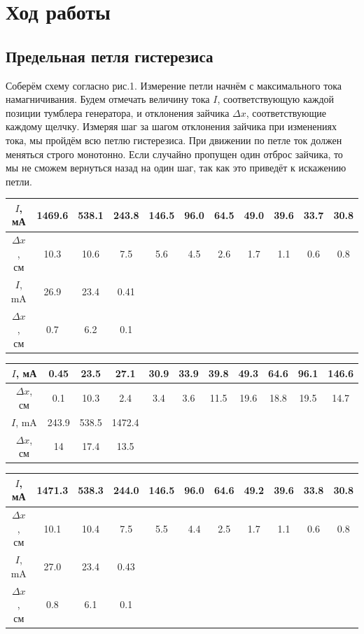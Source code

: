 \documentclass[12pt]{article}
\begin{document}
\section*{Ход работы}
\subsection*{Предельная петля гистерезиса}
	Соберём схему согласно рис.1. Измерение петли начнём с максимального тока намагничивания. Будем отмечать величину тока $I$, соответствующую каждой позиции тумблера генератора, и отклонения зайчика $\Delta x$, соответствующие каждому щелчку. Измеряя шаг за шагом отклонения зайчика при изменениях тока, мы пройдём всю петлю гистерезиса. При движении по петле ток должен меняться строго монотонно. Если случайно пропущен один отброс зайчика, то мы не сможем вернуться назад на один шаг, так как это приведёт к искажению петли.	
\begin{table}[h!]
	\centering
	\begin{tabular}{|c|c|c|c|c|c|c|c|c|c|c|}
	\hline
		$I$, мА & 1469.6 & 538.1 & 243.8 & 146.5 & 96.0 & 64.5 & 49.0 & 39.6 & 33.7 & 30.8 \\
	\hline
		$\Delta x$, см & 10.3 & 10.6 & 7.5	& 5.6	& 4.5	& 2.6	& 1.7	& 1.1	& 0.6	 & 0.8 \\
	\hline	
	   $I$, mA & 26.9 & 23.4 &  0.41 \\	   
	\cline{1-4}
		$\Delta x$, см & 0.7	& 6.2	& 0.1  \\		  
	\cline{1-4}
	\end{tabular}
\end{table}
\newpage
\begin{table}[h!]
	\centering
	\begin{tabular}{|c|c|c|c|c|c|c|c|c|c|c|}
	\hline
		$I$, мА & 0.45 & 23.5 & 27.1 & 30.9 & 33.9 & 39.8 & 49.3 & 64.6 & 96.1 & 146.6 \\
	\hline
		$\Delta x$, см & 0.1 & 10.3 & 2.4	& 3.4	& 3.6	& 11.5	& 19.6	& 18.8	& 19.5	& 14.7\\
	\hline	
	   $I$, mA & 243.9 & 538.5 & 1472.4 \\	   
	\cline{1-4}
		$\Delta x$, см & 14 & 17.4 & 13.5\\		  
	\cline{1-4}
	\end{tabular}
\end{table}
\begin{table}[h!]
	\centering
	\begin{tabular}{|c|c|c|c|c|c|c|c|c|c|c|}
	\hline
		$I$, мА & 1471.3 & 538.3 & 244.0 & 146.5 & 96.0 & 64.6 & 49.2 & 39.6 & 33.8 & 30.8 \\
	\hline
		$\Delta x$, см & 10.1 & 10.4 & 7.5	& 5.5	& 4.4	& 2.5	& 1.7	& 1.1	& 0.6	& 0.8\\
	\hline	
	   $I$, mA & 27.0 & 23.4 & 0.43 \\	   
	\cline{1-4}
		$\Delta x$, см & 0.8	& 6.1	& 0.1\\		  
	\cline{1-4}
	\end{tabular}
\end{table}
\end{document}
